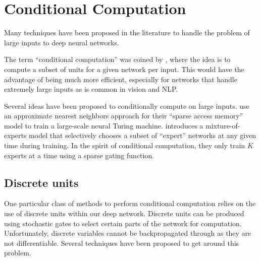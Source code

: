 \documentclass[11pt]{report}
\begin{document}
\section{Conditional Computation}




Many techniques have been proposed in the literature to handle the problem of large inputs to deep neural networks.

The term ``conditional computation'' was coined by \citet{BengioLC13}, where the idea is to compute a subset of units for a given network per input. This would have the advantage of being much more efficient, especially for networks that handle extremely large inputs as is common in vision and NLP.

Several ideas have been proposed to conditionally compute on large inputs. 
\citet{rae2016sparsememory} use an approximate nearest neighbors approach for their ``sparse access memory'' model to train a large-scale neural Turing machine. \citet{Shazeer2017} introduces a mixture-of-experts model that selectively chooses a subset of ``expert'' networks at any given time during training. In the spirit of conditional computation, they only train $K$ experts at a time using a sparse gating function.


\subsection{Discrete units}

One particular class of methods to perform conditional computation relies on the use of discrete units within our deep network. Discrete units can be produced using stochastic gates to select certain parts of the network for computation.
Unfortunately, discrete variables cannot be backpropagated through as they are not differentiable. Several techniques have been proposed to get around this problem.
\end{document}

